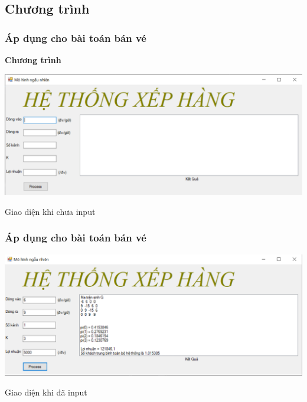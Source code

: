 \documentclass[10pt]{beamer}
\begin{document}
\subsection{Chương trình}
\begin{frame}
	\frametitle{Áp dụng cho bài toán bán vé}
	\begin{block}{\textbf{Chương trình}}
	\begin{center}
    \begin{center}
     \includegraphics[scale=.5]{img/giaodien1.PNG}
    \end{center}
    \caption{Giao diện khi chưa input}
\end{center}

	
\end{block}
\end{frame}
\begin{frame}
	\frametitle{Áp dụng cho bài toán bán vé}
	\begin{block}{}
	\begin{center}
    \begin{center}
     \includegraphics[scale=.5]{img/giaodien2.PNG}
    \end{center}
    \caption{Giao diện khi đã input}
\end{center}

	
\end{block}
\end{frame}
\end{document}
